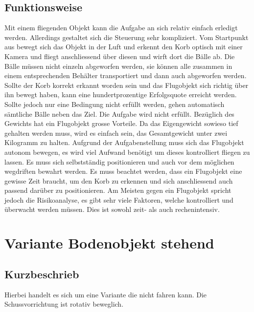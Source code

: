 \begin{landscape}
\subsection{Funktionsweise}
Mit einem fliegenden Objekt kann die Aufgabe an sich relativ einfach erledigt werden. Allerdings gestaltet sich die Steuerung sehr kompliziert. Vom Startpunkt aus bewegt sich das Objekt in der Luft und erkennt den Korb optisch mit einer Kamera und fliegt anschliessend über diesen und wirft dort die Bälle ab. Die Bälle müssen nicht einzeln abgeworfen werden, sie können alle zusammen in einem entsprechenden Behälter transportiert und dann auch abgeworfen werden. Sollte der Korb korrekt erkannt worden sein und das Flugobjekt sich richtig über ihn bewegt haben, kann eine hundertprozentige Erfolgsquote erreicht werden. Sollte jedoch nur eine Bedingung nicht erfüllt werden, gehen automatisch sämtliche Bälle neben das Ziel. Die Aufgabe wird nicht erfüllt. Bezüglich des Gewichts hat ein Flugobjekt grosse Vorteile. Da das Eigengewicht sowieso tief gehalten werden muss, wird es einfach sein, das Gesamtgewicht unter zwei Kilogramm zu halten.
Aufgrund der Aufgabenstellung muss sich das Flugobjekt autonom bewegen, es wird viel Aufwand benötigt um dieses kontrolliert fliegen zu lassen. Es muss sich selbstständig positionieren und auch vor dem möglichen wegdriften bewahrt werden. Es muss beachtet werden, dass ein Flugobjekt eine gewisse Zeit braucht, um den Korb zu erkennen und sich anschliessend auch passend darüber zu positionieren. Am Meisten gegen ein Flugobjekt spricht jedoch die Risikoanalyse, es gibt sehr viele Faktoren, welche kontrolliert und überwacht werden müssen. Dies ist sowohl zeit- als auch rechenintensiv. 



\clearpage

\section{Variante Bodenobjekt stehend}
\subsection{Kurzbeschrieb}
Hierbei handelt es sich um eine Variante die nicht fahren kann. Die Schussvorrichtung ist rotativ beweglich.


\end{landscape}
